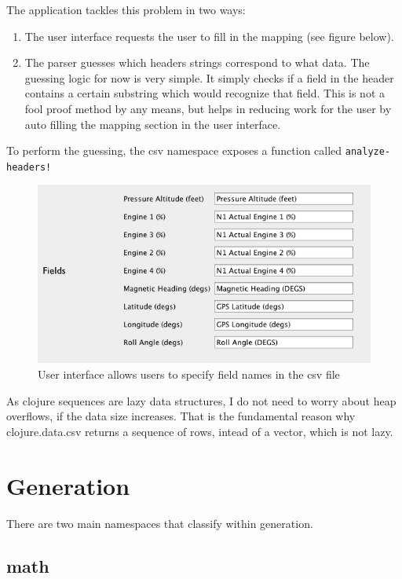 The application tackles this problem in two ways:
\begin{enumerate}

\item The user interface requests the user to fill in the mapping (see figure below).
\item The parser guesses which headers strings correspond to what data. The guessing logic for now is very simple. It simply checks if a field in the header contains a certain substring which would recognize that field. This is not a fool proof method by any means, but helps in reducing work for the user by auto filling the mapping section in the user interface.
\end{enumerate}

To perform the guessing, the csv namespace exposes a function called \lstinline{analyze-headers!}\\

\begin{figure}[h]
\centering
  \includegraphics[scale=0.7]{gfx/ui-fields.png}
\caption{User interface allows users to specify field names in the csv file}
\end{figure}

As clojure sequences are lazy data structures, I do not need to worry about heap overflows, if the data size increases. That is the fundamental reason why clojure.data.csv returns a sequence of rows, intead of a vector, which is not lazy.\\

\section{Generation}

There are two main namespaces that classify within generation.

\subsection{math}


